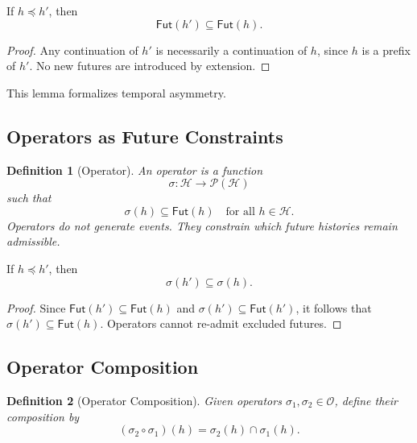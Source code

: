 \documentclass[11pt]{article}
\newtheorem{definition}{Definition}
\begin{document}
\begin{lemma}
If $h \preceq h'$, then
\[
\mathsf{Fut}(h') \subseteq \mathsf{Fut}(h).
\]
\end{lemma}

\begin{proof}
Any continuation of $h'$ is necessarily a continuation of $h$, since $h$ is a
prefix of $h'$. No new futures are introduced by extension.
\end{proof}

This lemma formalizes temporal asymmetry.

\subsection{Operators as Future Constraints}

\begin{definition}[Operator]
An operator is a function
\[
\sigma : \mathcal{H} \to \mathcal{P}(\mathcal{H})
\]
such that
\[
\sigma(h) \subseteq \mathsf{Fut}(h) \quad \text{for all } h \in \mathcal{H}.
\]
Operators do not generate events. They constrain which future histories remain
admissible.
\end{definition}

\begin{lemma}
If $h \preceq h'$, then
\[
\sigma(h') \subseteq \sigma(h).
\]
\end{lemma}

\begin{proof}
Since $\mathsf{Fut}(h') \subseteq \mathsf{Fut}(h)$ and
$\sigma(h') \subseteq \mathsf{Fut}(h')$, it follows that
$\sigma(h') \subseteq \mathsf{Fut}(h)$. Operators cannot re-admit excluded
futures.
\end{proof}

\subsection{Operator Composition}

\begin{definition}[Operator Composition]
Given operators $\sigma_1, \sigma_2 \in \mathcal{O}$, define their composition by
\[
(\sigma_2 \circ \sigma_1)(h) = \sigma_2(h) \cap \sigma_1(h).
\]
\end{definition}
\end{document}
